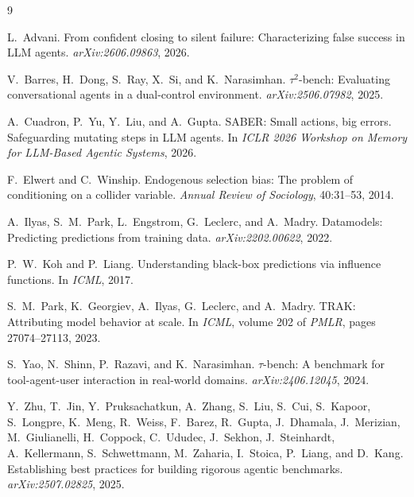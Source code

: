 \documentclass{article}
\begin{document}
\begin{thebibliography}{9}

L.~Advani.
\newblock From confident closing to silent failure: Characterizing false success in
LLM agents.
\newblock \emph{arXiv:2606.09863}, 2026.

V.~Barres, H.~Dong, S.~Ray, X.~Si, and K.~Narasimhan.
\newblock $\tau^2$-bench: Evaluating conversational agents in a dual-control
environment.
\newblock \emph{arXiv:2506.07982}, 2025.

A.~Cuadron, P.~Yu, Y.~Liu, and A.~Gupta.
\newblock SABER: Small actions, big errors. Safeguarding mutating steps in LLM agents.
\newblock In \emph{ICLR 2026 Workshop on Memory for LLM-Based Agentic Systems}, 2026.

F.~Elwert and C.~Winship.
\newblock Endogenous selection bias: The problem of conditioning on a collider
variable.
\newblock \emph{Annual Review of Sociology}, 40:31--53, 2014.

A.~Ilyas, S.~M.~Park, L.~Engstrom, G.~Leclerc, and A.~Madry.
\newblock Datamodels: Predicting predictions from training data.
\newblock \emph{arXiv:2202.00622}, 2022.

P.~W.~Koh and P.~Liang.
\newblock Understanding black-box predictions via influence functions.
\newblock In \emph{ICML}, 2017.

S.~M.~Park, K.~Georgiev, A.~Ilyas, G.~Leclerc, and A.~Madry.
\newblock TRAK: Attributing model behavior at scale.
\newblock In \emph{ICML}, volume 202 of \emph{PMLR}, pages 27074--27113, 2023.

S.~Yao, N.~Shinn, P.~Razavi, and K.~Narasimhan.
\newblock $\tau$-bench: A benchmark for tool-agent-user interaction in real-world
domains.
\newblock \emph{arXiv:2406.12045}, 2024.

Y.~Zhu, T.~Jin, Y.~Pruksachatkun, A.~Zhang, S.~Liu, S.~Cui, S.~Kapoor, S.~Longpre,
K.~Meng, R.~Weiss, F.~Barez, R.~Gupta, J.~Dhamala, J.~Merizian, M.~Giulianelli,
H.~Coppock, C.~Ududec, J.~Sekhon, J.~Steinhardt, A.~Kellermann, S.~Schwettmann,
M.~Zaharia, I.~Stoica, P.~Liang, and D.~Kang.
\newblock Establishing best practices for building rigorous agentic benchmarks.
\newblock \emph{arXiv:2507.02825}, 2025.

\end{thebibliography}
\end{document}

